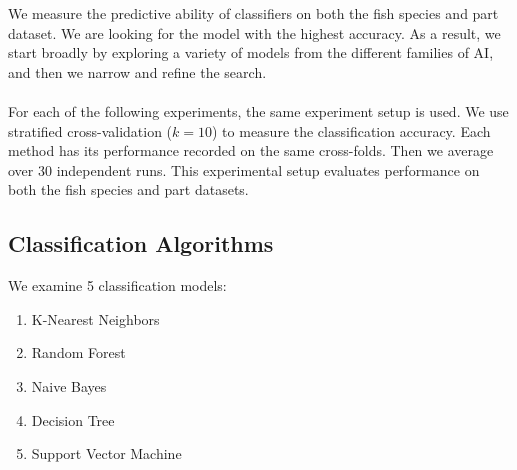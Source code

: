 \documentclass[runningheads]{llncs}
\begin{document}
We measure the predictive ability of classifiers on both the fish species and part dataset.
We are looking for the model with the highest accuracy.
As a result, we start broadly by exploring a variety of models from the different families of AI, and then we narrow and refine the search.
\\\\
For each of the following experiments, the same experiment setup is used.
We use stratified cross-validation ($k=10$) to measure the classification accuracy.
Each method has its performance recorded on the same cross-folds.
Then we average over 30 independent runs.
This experimental setup evaluates performance on both the fish species and part datasets.

\subsection{Classification Algorithms}




We examine 5 classification models:

\begin{enumerate}
  \item K-Nearest Neighbors \cite{fix1989discriminatory}
  \item Random Forest \cite{ho1995random}
  \item Naive Bayes \cite{hand2001idiot}
  \item Decision Tree \cite{loh2011classification}
  \item Support Vector Machine \cite{cortes1995support}
\end{enumerate}
\end{document}
